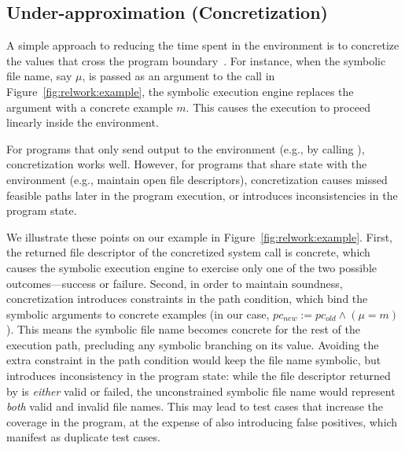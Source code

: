 \subsection{Under-approximation (Concretization)}

A simple approach to reducing the time spent in the environment is to concretize the values that cross the program boundary~\cite{dart,godefroid:fuzz,klee,exe}.
%
For instance, when the symbolic file name, say $\mu$, is passed as an argument to the  call in Figure~\ref{fig:relwork:example}, the symbolic execution engine replaces the argument with a concrete example $m$.  This causes the execution to proceed linearly inside the environment.


For programs that only send output to the environment (e.g., by calling ), concretization works well.
%
However, for programs that share state with the environment (e.g., maintain open file descriptors), concretization causes missed feasible paths later in the program execution, or introduces inconsistencies in the program state.

We illustrate these points on our example in Figure~\ref{fig:relwork:example}.
%
First, the returned file descriptor of the concretized  system call is concrete, which causes the symbolic execution engine to exercise only one of the two possible outcomes---success or failure.
%
Second, in order to maintain soundness, concretization introduces constraints in the path condition, which bind the symbolic arguments to concrete examples (in our case, $pc_{new} := pc_{old} \wedge (\mu = m)$).
%
This means the symbolic file name becomes concrete for the rest of the execution path, precluding any symbolic branching on its value.
%
Avoiding the extra constraint in the path condition would keep the file name symbolic, but introduces inconsistency in the program state: while the file descriptor returned by  is \emph{either} valid or failed, the unconstrained symbolic file name would represent \emph{both} valid and invalid file names.
%
This may lead to test cases that increase the coverage in the program, at the expense of also introducing false positives, which manifest as duplicate test cases.


